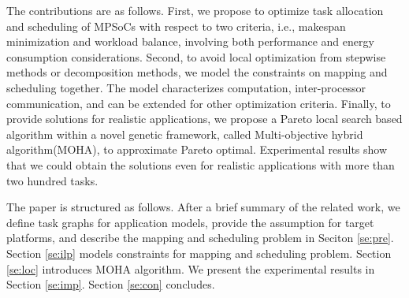 The contributions are as follows. First, we propose to optimize task allocation and scheduling of MPSoCs with respect to two criteria, i.e., makespan minimization and workload balance, involving both performance and energy consumption considerations. Second, to avoid local optimization from stepwise methods or decomposition methods, we model the constraints on mapping and scheduling together. The model characterizes computation, inter-processor communication, and can be extended for other optimization criteria. Finally, to provide solutions for realistic applications,        we propose a Pareto local search based algorithm within a novel genetic framework, called Multi-objective hybrid algorithm(MOHA), to approximate Pareto optimal. Experimental results show that
we could obtain the solutions even for realistic applications with more than two hundred tasks.

The paper is structured as follows. After a brief summary of the related work, we define task graphs for application models, provide the assumption for target platforms, and describe the mapping and scheduling problem in Seciton \ref{se:pre}. Section \ref{se:ilp} models constraints for mapping and scheduling problem.
Section \ref{se:loc} introduces MOHA algorithm.
We present the experimental results in Section \ref{se:imp}. Section \ref{se:con} concludes.

